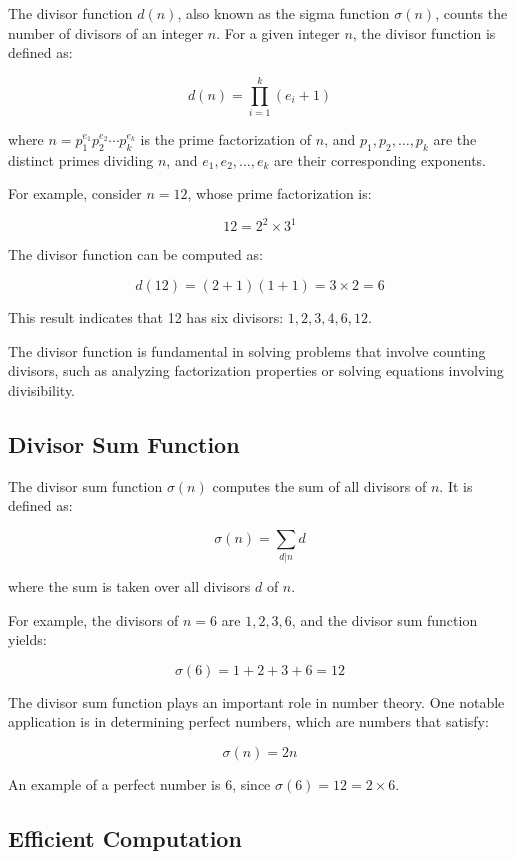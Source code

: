 \documentclass[10pt,a4paper]{article}
\begin{document}
The divisor function \(d(n)\), also known as the sigma function \(\sigma(n)\), counts the number of divisors of an integer \(n\). For a given integer \(n\), the divisor function is defined as:

\[
d(n) = \prod_{i=1}^{k} (e_i + 1)
\]

where \(n = p_1^{e_1} p_2^{e_2} \cdots p_k^{e_k}\) is the prime factorization of \(n\), and \(p_1, p_2, \dots, p_k\) are the distinct primes dividing \(n\), and \(e_1, e_2, \dots, e_k\) are their corresponding exponents.

For example, consider \(n = 12\), whose prime factorization is:

\[
12 = 2^2 \times 3^1
\]

The divisor function can be computed as:

\[
d(12) = (2 + 1)(1 + 1) = 3 \times 2 = 6
\]

This result indicates that 12 has six divisors: \(1, 2, 3, 4, 6, 12\).

The divisor function is fundamental in solving problems that involve counting divisors, such as analyzing factorization properties or solving equations involving divisibility.

\subsection*{Divisor Sum Function}

The divisor sum function \(\sigma(n)\) computes the sum of all divisors of \(n\). It is defined as:

\[
\sigma(n) = \sum_{d | n} d
\]

where the sum is taken over all divisors \(d\) of \(n\).

For example, the divisors of \(n = 6\) are \(1, 2, 3, 6\), and the divisor sum function yields:

\[
\sigma(6) = 1 + 2 + 3 + 6 = 12
\]

The divisor sum function plays an important role in number theory. One notable application is in determining perfect numbers, which are numbers that satisfy:

\[
\sigma(n) = 2n
\]

An example of a perfect number is 6, since \(\sigma(6) = 12 = 2 \times 6\).

\subsection*{Efficient Computation}
\end{document}
